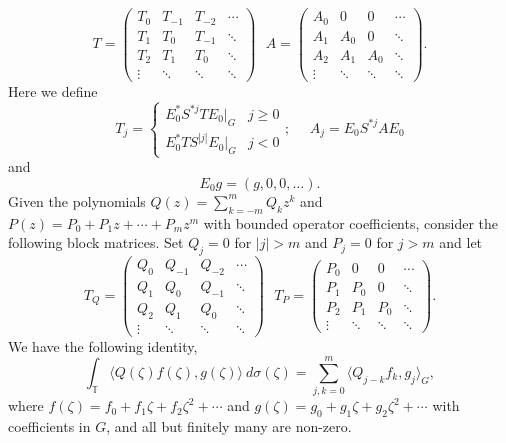 \documentclass[12 pt]{article}
\theoremstyle{plain}
\theoremstyle{definition}
\newcommand{\ip}[2]{\langle #1, #2\rangle}
\begin{document}
\begin{equation}\label{eq:blockmatrix}T=\begin{pmatrix}T_0 &T_{-1} &T_{-2 }& \cdots \\  T_1 & T_0 & T_{-1}& \ddots \\ T_2 & T_1 & T_0 & \ddots \\ \vdots & \ddots & \ddots  & \ddots\end{pmatrix}
\ \ \ A=\begin{pmatrix}A_0 &0 &0& \cdots \\  A_1 & A_0 & 0& \ddots \\ A_2 & A_1 & A_0 & \ddots \\ \vdots & \ddots & \ddots  & \ddots\end{pmatrix}.\end{equation}
Here we define 
\begin{equation}\label{eq:Toeplitzenty}T_j=\left\{ \begin{array}{lr} E^*_0 S^{*j}TE_0|_{G}& j\geq 0\\  E^*_0 TS^{|j|}E_0|_{G}& j<0\end{array}\right.;\ \ \ \ \ \ A_j=E_0S^{*j}AE_0\end{equation} 
and 
\[E_0g=(g,0, 0, \ldots ).\]
Given the polynomials  $Q(z)=\sum_{k=-m}^m Q_kz^k$ and $P(z)=P_0+P_1z+\cdots +P_mz^m$  with bounded operator coefficients, consider the following block matrices. Set $Q_j=0$ for $|j|>m$ and $P_j=0$ for $j>m$ and let
\begin{equation}\label{eq:QPmats}
T_Q=\begin{pmatrix}Q_0 &Q_{-1} &Q_{-2 }& \cdots \\  Q_1 & Q_0 & Q_{-1}& \ddots \\ Q_2 & Q_1 & Q_0 & \ddots \\ \vdots & \ddots & \ddots  & \ddots\end{pmatrix}
\ \ \ T_P=\begin{pmatrix}P_0 &0 &0& \cdots \\  P_1 & P_0 & 0& \ddots \\ P_2 & P_1 & P_0 & \ddots \\ \vdots & \ddots & \ddots  & \ddots\end{pmatrix}.
\end{equation} 
We have the following identity,
\begin{equation}\label{eq: innerprod}\int_{\mathbb{T}}\ip{Q(\zeta)f(\zeta)}{g(\zeta)}\ d\sigma(\zeta)=\sum_{j,k=0}^m\ip{Q_{j-k}f_k}{g_j}_G,\end{equation}
where $f(\zeta)=f_0+f_1\zeta +f_2\zeta^2+\cdots$  and $g(\zeta)=g_0+g_1\zeta +g_2\zeta^2+\cdots$ with coefficients in $G$, and all but finitely many are non-zero.
\end{document}
